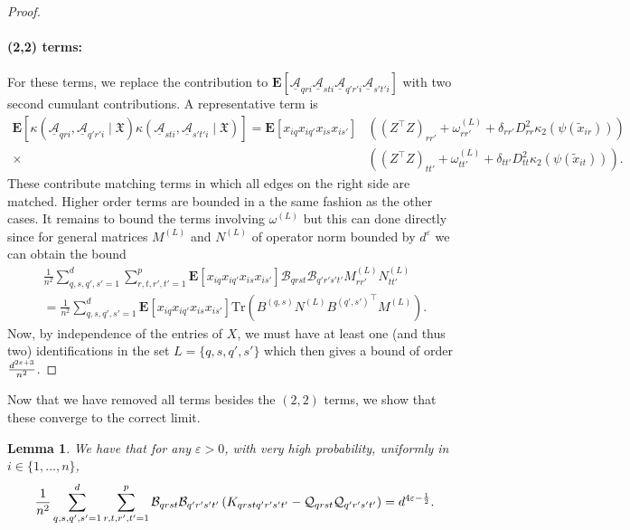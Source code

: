 \documentclass[letterpaper, 10pt, dvipsnames]{article}
\numberwithin{equation}{section}
\newcommand{\Au}{\underline{\mathcal{A}}}
\newcommand{\B}{\mathcal{B}}
\newcommand{\Q}{\mathcal{Q}}
\newcommand{\wt}{\widetilde}
\let\O\relax
\newcommand{\O}[1]{\mathcal{O}\left(#1\right)}
\newcommand{\Eb}{\mathbf{E}}
\newtheorem{lem}[ccounter]{Lemma}
\theoremstyle{definition}
\begin{document}
\begin{proof}
    \paragraph{(2,2) terms:}
    For these terms, we replace the contribution to $\Eb\left[
      \Au_{qri}\Au_{sti}\Au_{q'r'i}\Au_{s't'i}
      \right]$
    with two second cumulant contributions.  A representative term is 
    \[
    \begin{aligned}
    \Eb\left[
    \kappa(\Au_{qri},\Au_{q'r'i} \mid \mathfrak{X})
    \kappa(\Au_{sti},\Au_{s't'i} \mid \mathfrak{X})
    \right]
    =
    \Eb\left[
      x_{iq}x_{iq'}x_{is}x_{is'}
      \right]
      &\left(
        (Z^{\top}Z)_{rr'} + \omega^{(L)}_{rr'} + \delta_{r r'} D_{rr}^2 \kappa_2(\psi(\wt{x}_{ir}))
      \right)\\
    \times&\left(
        (Z^{\top}Z)_{tt'} + \omega^{(L)}_{tt'} + \delta_{t t'} D_{tt}^2 \kappa_2(\psi(\wt{x}_{it}))
      \right).
    \end{aligned}
    \]
    These contribute matching terms in which all edges on the right side are matched.  Higher order terms are bounded in a the same fashion as the other cases. It remains to bound the terms involving $\omega^{(L)}$ but this can done directly since for general matrices $M^{(L)}$ and $N^{(L)}$ of operator norm bounded by $d^{\varepsilon}$ we can obtain the bound 
    \begin{multline*}
      \frac{1}{n^2}\sum_{q,s,q',s'=1}^d \sum_{r,t,r',t'=1}^p 
      \Eb\left[
        x_{iq}x_{iq'}x_{is}x_{is'}
      \right]
      \B_{qrst}\B_{q'r's't'}
      M^{(L)}_{rr'}N^{(L)}_{tt'}
      \\=
      \frac{1}{n^2}
      \sum_{q,s,q',s'=1}^d 
      \Eb\left[
        x_{iq}x_{iq'}x_{is}x_{is'} 
      \right]
      \mathrm{Tr}\left(
        B^{(q,s)}N^{(L)}{B^{(q',s')}}^\top M^{(L)}
      \right).
    \end{multline*}
Now, by independence of the entries of $X$, we must have at least one (and thus two) identifications in the set $L=\{q,s,q',s'\}$ which then gives a bound of order $\O{\frac{d^{2\varepsilon+3}}{n^2}}$.
\end{proof}
Now that we have removed all terms besides the $(2,2)$ terms, we show that these converge to the correct limit.
\begin{lem}\label{lem:baizhou-1}
  We have that for any $\varepsilon >0$, with very high probability, uniformly in $i\in\{1,\dots,n\}$, 
  \[
  \frac{1}{n^2}\sum_{q,s,q',s'=1}^d\sum_{r,t,r',t'=1}^p \B_{qrst}\B_{q'r's't'}
  \left(
      K_{qrstq'r's't'}
      -
      \Q_{qrst}\Q_{q'r's't'}
  \right)
  =
  \O{d^{4\varepsilon-\frac{1}{2}}}.
  \]
\end{lem}
\end{document}

